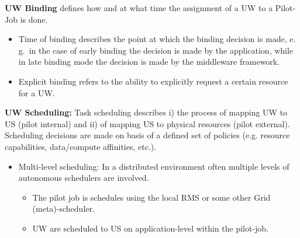 \documentclass[conference,final]{IEEEtran}
\begin{document}
\textbf{UW Binding} defines how and at what time the assignment of a UW to a 
Pilot-Job is done.
	\begin{itemize}
		\item Time of binding describes the point at which the binding decision 
		is made, e.\,g.\ in the case of early binding the decision is made by 
		the application, while in late binding mode the decision is made by the 
		middleware framework.
		\item Explicit binding refers to the ability to explicitly 
		request a certain resource for a UW.		
	\end{itemize}
\textbf{UW Scheduling:} Task scheduling describes i) the process of  
	mapping UW to US (pilot internal) and ii) of mapping US to physical 
	resources (pilot external). Scheduling decisions are made on basis of a 
	defined set of policies (e.g. resource capabilities, data/compute 
	affinities, etc.).
	\begin{itemize}
	 			\item Multi-level scheduling: In a distributed environment often multiple levels of autonomous schedulers are involved. 
	 			\begin{itemize}	 			  
	 			   \item The pilot job is schedules using the local RMS or some 
	 			   other Grid (meta)-scheduler.
	 			   \item UW are scheduled to US on application-level within the 
	 			   pilot-job.
	 			\end{itemize}
	\end{itemize}

	
	
\end{document}
